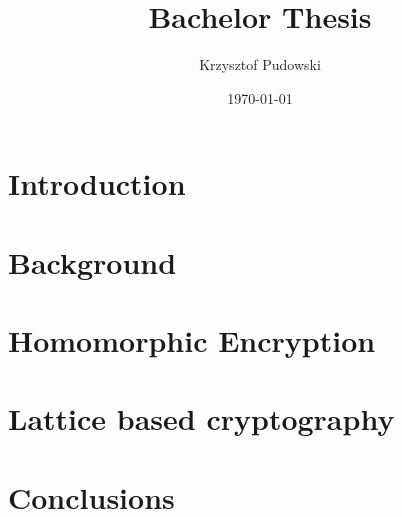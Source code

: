\documentclass[11pt,a4paper]{article}
\title{Bachelor Thesis}
\author{Krzysztof Pudowski}
\date{\today}
\theoremstyle{plain}
\theoremstyle{definition}
\theoremstyle{remark}
\begin{document}



{\hypersetup{hidelinks} \tableofcontents}

\section{Introduction}


\section{Background}


\section{Homomorphic Encryption}


\section{Lattice based cryptography}


\section{Conclusions}


\newpage
\printbibliography
{}
\end{document}
